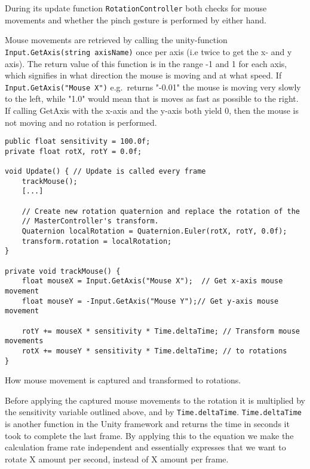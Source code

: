 During its update function \texttt{RotationController} both checks for mouse movements and whether the pinch gesture is performed by either hand.

Mouse movements are retrieved by calling the unity-function \texttt{Input.GetAxis(string axisName)} once per axis (i.e twice to get the x- and y axis). 
The return value of this function is in the range -1 and 1 for each axis, which signifies in what direction the mouse is moving and at what speed. 
If \texttt{Input.GetAxis("Mouse X")} e.g.~returns "-0.01" the mouse is moving very slowly to the left, while "1.0" would mean that is moves as fast as possible to the right. 
If calling GetAxis with the x-axis and the y-axis both yield 0, then the mouse is not moving and no rotation is performed.

\begin{table}
\label{table:rotation_mouse_code}
\lstset{style=csharp}
\begin{lstlisting}
public float sensitivity = 100.0f;
private float rotX, rotY = 0.0f;

void Update() { // Update is called every frame
    trackMouse();
    [...]
    
    // Create new rotation quaternion and replace the rotation of the 
    // MasterController's transform. 
    Quaternion localRotation = Quaternion.Euler(rotX, rotY, 0.0f);
    transform.rotation = localRotation;         
}

private void trackMouse() {
    float mouseX = Input.GetAxis("Mouse X");  // Get x-axis mouse movement
    float mouseY = -Input.GetAxis("Mouse Y");// Get y-axis mouse movement

    rotY += mouseX * sensitivity * Time.deltaTime; // Transform mouse movements
    rotX += mouseY * sensitivity * Time.deltaTime; // to rotations  
}                                                                                
\end{lstlisting}
\caption[How mouse movement is captured and transformed to rotations]{How mouse movement is captured and transformed to rotations.} 
\end{table}


Before applying the captured mouse movements to the rotation it is multiplied by the sensitivity variable outlined above, and by \texttt{Time.deltaTime}.
\texttt{Time.deltaTime} is another function in the Unity framework and returns the time in seconds it took to complete the last frame.
By applying this to the equation we make the calculation frame rate independent and essentially expresses that we want to rotate X amount per second, instead of
X amount per frame.

